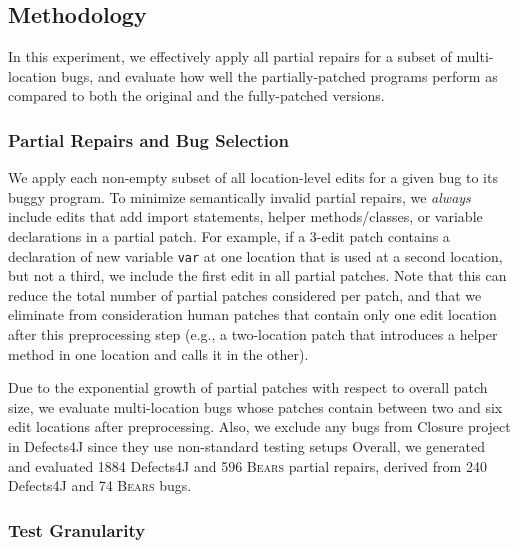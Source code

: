 \documentclass[10pt, conference]{IEEEtran}
\newcommand\bears{\textsc{Bears}\xspace}
\begin{document}
\subsection{Methodology}
\label{sec:partial-repair-methodology}

In this experiment, we effectively apply all partial repairs for
a subset of multi-location bugs, and
evaluate how well the partially-patched programs perform 
as compared to both the original and the fully-patched versions. 

\subsubsection{Partial Repairs and Bug Selection}
We apply each non-empty subset of all location-level edits for a given bug to
its buggy program.  To minimize semantically invalid partial repairs, we \emph{always}
include edits that add import statements, helper methods/classes, or variable declarations
in a partial patch. 
For example, if a 3-edit patch contains a declaration of new variable
\texttt{var} at one location that is used at a second location, but not a third,
we include the first edit in all partial patches.  Note that this can reduce the total
number of partial patches considered per patch, and that we eliminate from
consideration human patches that contain only 
one edit location after this preprocessing step (e.g., a two-location patch that introduces a
helper method in one location and calls it in the other).  

Due to the exponential growth of partial patches with respect to overall patch size,
we evaluate multi-location bugs whose patches 
contain between two and six edit locations after preprocessing.
Also, we exclude any bugs from Closure project in Defects4J since they use non-standard testing setups
Overall, we generated and evaluated 1884 Defects4J and 596 \bears partial repairs,
derived from 240 Defects4J and 74 \bears bugs.

\subsubsection{Test Granularity}
\end{document}
